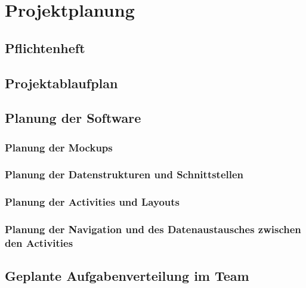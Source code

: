 \section{Projektplanung}
\label{concept}

\subsection{Pflichtenheft}

\subsection{Projektablaufplan}

\subsection{Planung der Software}

\subsubsection{Planung der Mockups}

\subsubsection{Planung der Datenstrukturen und Schnittstellen}

\subsubsection{Planung der Activities und Layouts}

\subsubsection{Planung der Navigation und des Datenaustausches zwischen den Activities }

\subsection{Geplante Aufgabenverteilung im Team}
